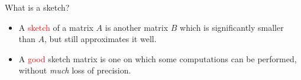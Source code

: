\documentclass[first=dgreen,second=purple,logo=redque]{aaltoslides}
\begin{document}





\begin{frame}{What is a sketch?}
\begin{itemize}
  \item A \textcolor{red}{sketch} of a matrix $A$ is another matrix $B$ which is significantly
  \textcolor{dgreen}{smaller} than $A$, but still approximates it \textcolor{dgreen}{well}.
  \item A \textcolor{red}{good} sketch matrix is one on which some computations can
  be performed, \textcolor{dgreen}{without} \textit{much} loss of precision.
\end{itemize}
\end{frame}

\end{document}

